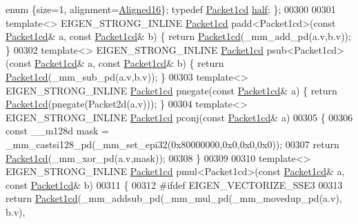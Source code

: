\begin{DoxyCode}
{      enum} \{size=1, alignment=\hyperlink{group__enums_gga45fe06e29902b7a2773de05ba27b47a1af8e2bf74b04c02199f62c5e3c06dbfcc}{Aligned16}\}; \textcolor{keyword}{typedef} \hyperlink{struct_eigen_1_1internal_1_1_packet1cd}{Packet1cd} \hyperlink{struct_eigen_1_1internal_1_1_packet1cd}{half}; \};
00300 
00301 \textcolor{keyword}{template}<> EIGEN\_STRONG\_INLINE \hyperlink{struct_eigen_1_1internal_1_1_packet1cd}{Packet1cd} padd<Packet1cd>(\textcolor{keyword}{const} 
      \hyperlink{struct_eigen_1_1internal_1_1_packet1cd}{Packet1cd}& a, \textcolor{keyword}{const} \hyperlink{struct_eigen_1_1internal_1_1_packet1cd}{Packet1cd}& b) \{ \textcolor{keywordflow}{return} \hyperlink{struct_eigen_1_1internal_1_1_packet1cd}{Packet1cd}(\_mm\_add\_pd(a.v,b.v)); \}
00302 \textcolor{keyword}{template}<> EIGEN\_STRONG\_INLINE \hyperlink{struct_eigen_1_1internal_1_1_packet1cd}{Packet1cd} psub<Packet1cd>(\textcolor{keyword}{const} 
      \hyperlink{struct_eigen_1_1internal_1_1_packet1cd}{Packet1cd}& a, \textcolor{keyword}{const} \hyperlink{struct_eigen_1_1internal_1_1_packet1cd}{Packet1cd}& b) \{ \textcolor{keywordflow}{return} \hyperlink{struct_eigen_1_1internal_1_1_packet1cd}{Packet1cd}(\_mm\_sub\_pd(a.v,b.v)); \}
00303 \textcolor{keyword}{template}<> EIGEN\_STRONG\_INLINE \hyperlink{struct_eigen_1_1internal_1_1_packet1cd}{Packet1cd} pnegate(\textcolor{keyword}{const} \hyperlink{struct_eigen_1_1internal_1_1_packet1cd}{Packet1cd}& a) \{ \textcolor{keywordflow}{return} 
      \hyperlink{struct_eigen_1_1internal_1_1_packet1cd}{Packet1cd}(pnegate(Packet2d(a.v))); \}
00304 \textcolor{keyword}{template}<> EIGEN\_STRONG\_INLINE \hyperlink{struct_eigen_1_1internal_1_1_packet1cd}{Packet1cd} pconj(\textcolor{keyword}{const} \hyperlink{struct_eigen_1_1internal_1_1_packet1cd}{Packet1cd}& a)
00305 \{
00306   \textcolor{keyword}{const} \_\_m128d mask = \_mm\_castsi128\_pd(\_mm\_set\_epi32(0x80000000,0x0,0x0,0x0));
00307   \textcolor{keywordflow}{return} \hyperlink{struct_eigen_1_1internal_1_1_packet1cd}{Packet1cd}(\_mm\_xor\_pd(a.v,mask));
00308 \}
00309 
00310 \textcolor{keyword}{template}<> EIGEN\_STRONG\_INLINE \hyperlink{struct_eigen_1_1internal_1_1_packet1cd}{Packet1cd} pmul<Packet1cd>(\textcolor{keyword}{const} 
      \hyperlink{struct_eigen_1_1internal_1_1_packet1cd}{Packet1cd}& a, \textcolor{keyword}{const} \hyperlink{struct_eigen_1_1internal_1_1_packet1cd}{Packet1cd}& b)
00311 \{
00312 \textcolor{preprocessor}{  #ifdef EIGEN\_VECTORIZE\_SSE3}
00313   \textcolor{keywordflow}{return} \hyperlink{struct_eigen_1_1internal_1_1_packet1cd}{Packet1cd}(\_mm\_addsub\_pd(\_mm\_mul\_pd(\_mm\_movedup\_pd(a.v), b.v),

\end{DoxyCode}
